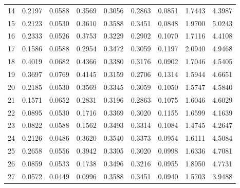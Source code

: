 \begin{anexosenv}
\begin{table}[htbp!]
\begin{tabular}{|l|l|l|l|l|l|l|l|l|}
14   & 0.2197  & 0.0588   & 0.3569               & 0.3056  & 0.2863   & 0.0851               & 1.7443 & 4.3987               \\
15   & 0.2123  & 0.0530   & 0.3610               & 0.3588  & 0.3451   & 0.0848               & 1.9700 & 5.0243               \\
16   & 0.2333  & 0.0526   & 0.3753               & 0.3229  & 0.2902   & 0.1070               & 1.7116 & 4.4108               \\
17   & 0.1586  & 0.0588   & 0.2954               & 0.3472  & 0.3059   & 0.1197               & 2.0940 & 4.9468               \\
18   & 0.4019  & 0.0682   & 0.4366               & 0.3380  & 0.3176   & 0.0902               & 1.7046 & 4.5405               \\
19   & 0.3697  & 0.0769   & 0.4145               & 0.3159  & 0.2706   & 0.1314               & 1.5944 & 4.6651               \\
20   & 0.2185  & 0.0530   & 0.3569               & 0.3345  & 0.3059   & 0.1050               & 1.5747 & 4.5840               \\
21   & 0.1571  & 0.0652   & 0.2831               & 0.3196  & 0.2863   & 0.1075               & 1.6046 & 4.6029               \\
22   & 0.0895  & 0.0530   & 0.1716               & 0.3369  & 0.3020   & 0.1155               & 1.6599 & 4.1639               \\
23   & 0.0822  & 0.0588   & 0.1562               & 0.3493  & 0.3314   & 0.1084               & 1.4745 & 4.2647               \\
24   & 0.2126  & 0.0486   & 0.3620               & 0.3540  & 0.3373   & 0.0954               & 1.6111 & 4.5084               \\
25   & 0.2658  & 0.0556   & 0.3942               & 0.3305  & 0.3020   & 0.0998               & 1.6336 & 4.7081               \\
26   & 0.0859  & 0.0533   & 0.1738               & 0.3496  & 0.3216   & 0.0955               & 1.8950 & 4.7731               \\
27   & 0.0572  & 0.0449   & 0.0996               & 0.3588  & 0.3451   & 0.0940               & 1.5703 & 3.9488              \\\hline
\end{tabular}
\end{table}




\end{anexosenv}
